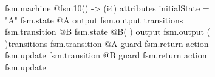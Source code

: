 \documentclass[acmsmall,screen,review]{acmart}
\begin{document}
\begin{figure}
\begin{subfigure}[T]{0.5\columnwidth}
  \begin{mlir}
  fsm.machine @fsm10() -> (i4) attributes {initialState = "A"} {
    fsm.state @A output {
      fsm.output %
    } transitions { 
      fsm.transition @B
    }
    fsm.state @B( ) output {
      fsm.output %
    } ( )transitions {
      fsm.transition @A guard {
        fsm.return %
      } action {
        fsm.update %
      }
      fsm.transition @B guard {
        fsm.return %
      } action {
        fsm.update %
      }
    }
  }
  \end{mlir}
\end{subfigure}
\hfill
\begin{subfigure}[T]{0.3\columnwidth}

\end{subfigure}
\end{figure}
\end{document}
